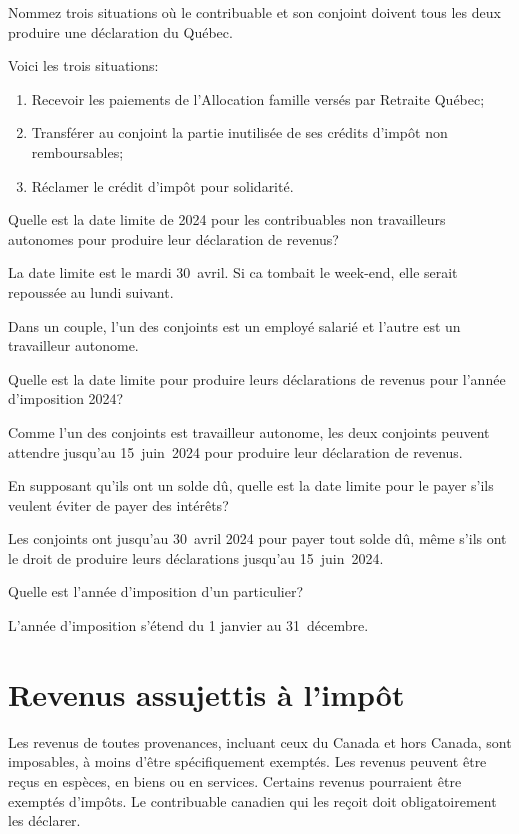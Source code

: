 \begin{question}
	Nommez trois situations où le contribuable et son conjoint doivent tous les deux produire une déclaration du Québec.
\end{question}
Voici les trois situations:
\begin{enumerate}
	\item Recevoir les paiements de l'Allocation famille versés par Retraite Québec;
	\item Transférer au conjoint la partie inutilisée de ses crédits d'impôt non remboursables;
	\item Réclamer le crédit d'impôt pour solidarité.
\end{enumerate}

\begin{question}
	Quelle est la date limite de 2024 pour les contribuables non travailleurs autonomes pour produire leur déclaration de revenus?
\end{question}
La date limite est le mardi 30~avril. Si ca tombait le week-end, elle serait repoussée au lundi suivant.

\begin{question}
	Dans un couple, l'un des conjoints est un employé salarié et l'autre est un travailleur autonome.
\end{question}
\setcounter{sousQuestion}{0}
\begin{sousQuestion}
	Quelle est la date limite pour produire leurs déclarations de revenus pour l'année d'imposition 2024?
\end{sousQuestion}
Comme l'un des conjoints est travailleur autonome, les deux conjoints peuvent attendre jusqu'au 15~juin~2024 pour produire leur déclaration de revenus.
\begin{sousQuestion}
	En supposant qu'ils ont un solde dû, quelle est la date limite pour le payer s'ils veulent éviter de payer des intérêts?
\end{sousQuestion}
Les conjoints ont jusqu'au 30~avril 2024 pour payer tout solde dû, même s'ils ont le droit de produire leurs déclarations jusqu'au 15~juin~2024.

\begin{question}
	Quelle est l'année d'imposition d'un particulier?
\end{question}
L'année d'imposition s'étend du 1 janvier au 31~décembre.



\section{Revenus assujettis à l'impôt}
\begin{intro}
	Les revenus de toutes provenances, incluant ceux du Canada et hors Canada, sont imposables, à moins d'être spécifiquement exemptés. Les revenus peuvent être reçus en espèces, en biens ou en services. Certains revenus pourraient être exemptés d'impôts. Le contribuable canadien qui les reçoit doit obligatoirement les déclarer.
\end{intro}


